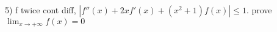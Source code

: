 5) f twice cont diff, $|f''(x)+2xf'(x)+(x^{2}+1)f(x)|\leq 1$. prove $\lim_{x\rightarrow +\infty} f(x) = 0$